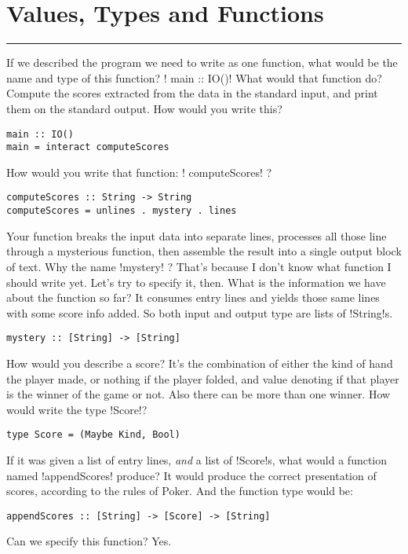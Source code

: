 
 \newpage
\section{Values, Types and Functions} 
\vspace{10cm}
\hrule

\lhQ If we described the program we need to write as one function, what would be the name and type of this function? 
\lhA \il! main :: IO()!
\lhN What would that function do?
\lhA Compute the scores extracted from the data in the standard input, and print them on the standard output.
\lhN How would you write this?
\lhA \begin{lstlisting}[frame=single] 
main :: IO()
main = interact computeScores
\end{lstlisting}
\lhN How would you write that function: \il! computeScores! ?
\lhA \begin{lstlisting}[frame=single] 
computeScores :: String -> String
computeScores = unlines . mystery . lines
\end{lstlisting}
\lhN Your function breaks the input data into separate lines, processes all those line through a mysterious function, then assemble the result into a single output block of text. Why the name \il!mystery! ?  
\lhA That's because I don't know what function I should write yet.
\lhN Let's try to specify it, then. What is the information we have about the function so far?
\lhA It consumes entry lines and yields those same lines with some score info added. So both input and output type are lists of \il!String!s. 
\begin{lstlisting}[frame=single] 
mystery :: [String] -> [String]
\end{lstlisting}
\lhN How would you describe a score?
\lhA It's the combination of either the kind of hand the player made, or nothing if the player folded, and value denoting if that player is the winner of the game or not. Also there can be more than one winner.
\lhN How would write the type \il!Score!?
\lhA
\begin{lstlisting}[frame=single] 
type Score = (Maybe Kind, Bool)
\end{lstlisting}
\lhN If it was given a list of entry lines, \emph{and} a list of \il!Score!s, what would a function named \il!appendScores! produce?
\lhA It would produce the correct presentation of scores, according to the rules of Poker. And the function type would be:
\begin{lstlisting}[frame=single] 
appendScores :: [String] -> [Score] -> [String]
\end{lstlisting}
\lhN Can we specify this function?
\lhA Yes.
\lhend

